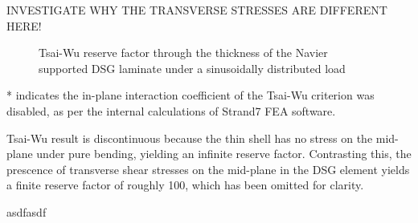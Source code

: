 INVESTIGATE WHY THE TRANSVERSE STRESSES ARE DIFFERENT HERE!

\begin{figure}[H]
	\caption{\label{Navier_tri_composite_trans}Tsai-Wu reserve factor through the thickness of the Navier supported DSG laminate under a sinusoidally distributed load}
\end{figure}

* indicates the in-plane interaction coefficient of the Tsai-Wu criterion was disabled, as per the internal calculations of Strand7 FEA software.

Tsai-Wu result is discontinuous because the thin shell has no stress on the mid-plane under pure bending, yielding an infinite reserve factor. Contrasting this, the prescence of transverse shear stresses on the mid-plane in the DSG element yields a finite reserve factor of roughly 100, which has been omitted for clarity.

asdfasdf